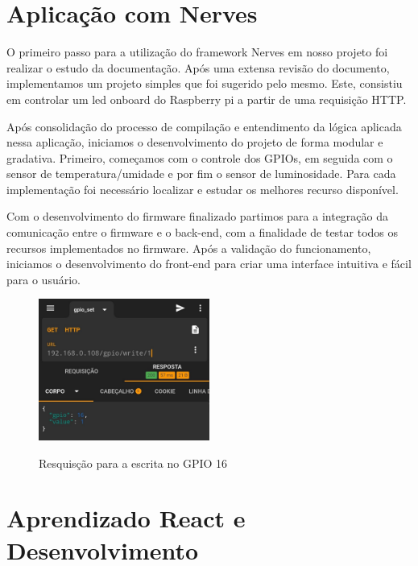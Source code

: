\documentclass[../../layout.tex]{subfiles}
\begin{document}
\section{Aplicação com Nerves}
\hspace*{3em}O primeiro passo para a utilização do framework Nerves em nosso projeto foi realizar o estudo da documentação. Após uma extensa revisão do documento, implementamos um projeto simples que foi sugerido pelo mesmo. Este, consistiu em controlar um led onboard do Raspberry pi a partir de uma requisição HTTP.\par
Após consolidação do processo de compilação e entendimento da lógica aplicada nessa aplicação, iniciamos o desenvolvimento do projeto de forma modular e gradativa. Primeiro, começamos com o controle dos GPIOs, em seguida com o sensor de temperatura/umidade e por fim o sensor de luminosidade. Para cada implementação  foi necessário localizar e estudar os melhores recurso disponível.\par 
Com o desenvolvimento do firmware finalizado partimos para a integração da comunicação entre o firmware e o back-end, com a finalidade de testar todos os recursos implementados no firmware. Após a validação do funcionamento, iniciamos o desenvolvimento do front-end para criar uma interface intuitiva e fácil para o usuário.

\begin{figure}[H]
\centering
\caption{Resquisção para a escrita no GPIO 16}
\includegraphics[width=0.5\textwidth]{assets/static/img/request.jpg}
\label{fig:request_gpio}
\begin{minipage}{0.5\textwidth}
\end{minipage}
\end{figure}


\section{Aprendizado React e Desenvolvimento}
\end{document}
